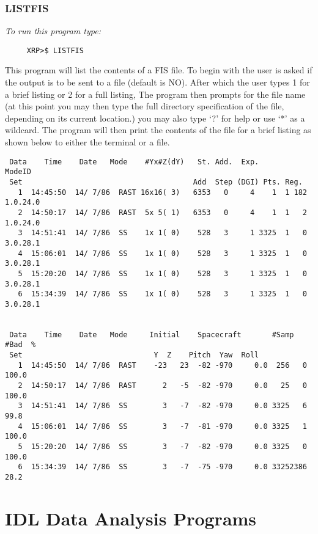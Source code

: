 \subsubsection{LISTFIS}             

{\em To run this program type:}
\begin{verbatim}                
     XRP>$ LISTFIS               
\end{verbatim}
  This program will list the contents of a FIS file. To begin with the user is asked if 
  the output is to be sent to a file (default is NO). After which the user types
  1 for a brief listing or 2 for a full listing, The program then prompts for
  the file name (at this point you may then type the full directory specification of
  the file, depending on its current location.) you may also type `?' for help or
  use `*' as a wildcard. The program will then print the contents of the file 
  for a brief listing as shown below to either the terminal or a file.
\begin{verbatim}
 Data    Time    Date   Mode    #Yx#Z(dY)   St. Add.  Exp.         ModeID             
 Set                                       Add  Step (DGI) Pts. Reg.                      
   1  14:45:50  14/ 7/86  RAST 16x16( 3)   6353   0     4    1  1 182 1.0.24.0  
   2  14:50:17  14/ 7/86  RAST  5x 5( 1)   6353   0     4    1  1   2 1.0.24.0     
   3  14:51:41  14/ 7/86  SS    1x 1( 0)    528   3     1 3325  1   0 3.0.28.1     
   4  15:06:01  14/ 7/86  SS    1x 1( 0)    528   3     1 3325  1   0 3.0.28.1      
   5  15:20:20  14/ 7/86  SS    1x 1( 0)    528   3     1 3325  1   0 3.0.28.1       
   6  15:34:39  14/ 7/86  SS    1x 1( 0)    528   3     1 3325  1   0 3.0.28.1        


 Data    Time    Date   Mode     Initial    Spacecraft       #Samp #Bad  %           
 Set                              Y  Z    Pitch  Yaw  Roll                          
   1  14:45:50  14/ 7/86  RAST    -23   23  -82 -970     0.0  256   0 100.0
   2  14:50:17  14/ 7/86  RAST      2   -5  -82 -970     0.0   25   0 100.0
   3  14:51:41  14/ 7/86  SS        3   -7  -82 -970     0.0 3325   6  99.8
   4  15:06:01  14/ 7/86  SS        3   -7  -81 -970     0.0 3325   1 100.0
   5  15:20:20  14/ 7/86  SS        3   -7  -82 -970     0.0 3325   0 100.0
   6  15:34:39  14/ 7/86  SS        3   -7  -75 -970     0.0 33252386  28.2
\end{verbatim}

\newpage

\section{IDL Data Analysis Programs}

